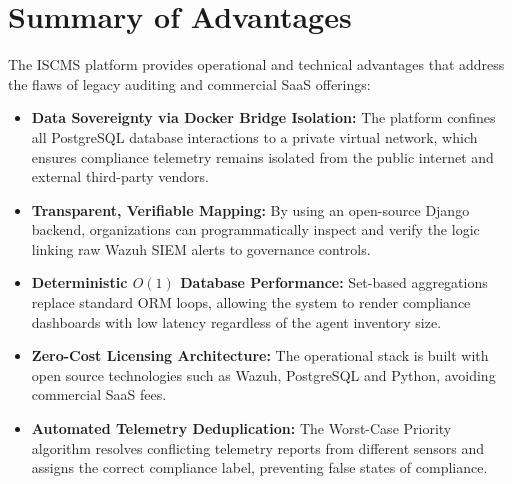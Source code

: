 \section{Summary of Advantages}
The ISCMS platform provides operational and technical advantages that address the flaws of legacy auditing and commercial SaaS offerings:

\begin{itemize}
    \item \textbf{Data Sovereignty via Docker Bridge Isolation:} The platform confines all PostgreSQL database interactions to a private virtual network, which ensures compliance telemetry remains isolated from the public internet and external third-party vendors.
    \item \textbf{Transparent, Verifiable Mapping:} By using an open-source Django backend, organizations can programmatically inspect and verify the logic linking raw Wazuh SIEM alerts to governance controls.
    \item \textbf{Deterministic $O(1)$ Database Performance:} Set-based aggregations replace standard ORM loops, allowing the system to render compliance dashboards with low latency regardless of the agent inventory size.
    \item \textbf{Zero-Cost Licensing Architecture:} The operational stack is built with open source technologies such as Wazuh, PostgreSQL and Python, avoiding commercial SaaS fees.
    \item \textbf{Automated Telemetry Deduplication:} The Worst-Case Priority algorithm resolves conflicting telemetry reports from different sensors and assigns the correct compliance label, preventing false states of compliance.
\end{itemize}
